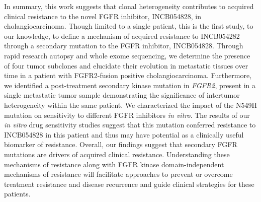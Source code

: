 In summary, this work suggests that clonal heterogeneity contributes to acquired clinical resistance to the novel FGFR inhibitor, INCB054828, in cholangiocarcinoma. Though limited to a single patient, this is the first study, to our knowledge, to define a mechanism of acquired resistance to INCB054282 through a secondary mutation to the FGFR inhibitor, INCB054828. Through rapid research autopsy and whole exome sequencing, we determine the presence of four tumor subclones and elucidate their evolution in metastatic tissues over time in a patient with FGFR2-fusion positive cholangiocarcinoma. Furthermore, we identified a post-treatment secondary kinase mutation in \textit{FGFR2}, present in a single metastatic tumor sample demonstrating the significance of intertumor heterogeneity within the same patient. We characterized the impact of the N549H mutation on sensitivity to different FGFR inhibitors \textit{in vitro}. The results of our \textit{in vitro} drug sensitivity studies suggest that this mutation conferred resistance to INCB054828 in this patient and thus may have potential as a clinically useful biomarker of resistance. Overall, our findings suggest that secondary FGFR mutations are drivers of acquired clinical resistance. Understanding these mechanisms of resistance along with FGFR kinase domain-independent mechanisms of resistance will facilitate approaches to prevent or overcome treatment resistance and disease recurrence and guide clinical strategies for these patients.

